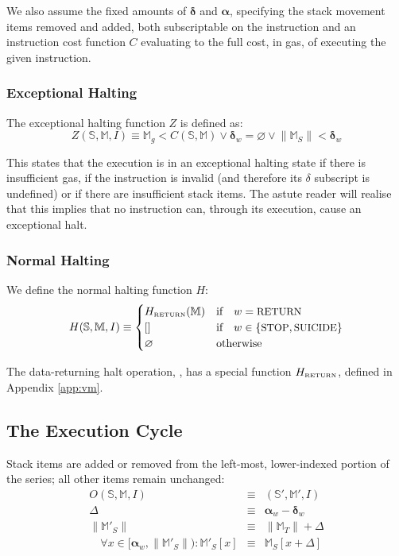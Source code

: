\documentclass[9pt,oneside]{amsart}
\begin{document}
\begin{multicols}{2}
We also assume the fixed amounts of $\mathbf{\delta}$ and $\mathbf{\alpha}$, specifying the stack movement items removed and added, both subscriptable on the instruction and an instruction cost function $C$ evaluating to the full cost, in gas, of executing the given instruction.

\subsubsection{Exceptional Halting}

The exceptional halting function $Z$ is defined as:
\begin{equation}
Z(\mathbb{S}, \mathbb{M}, I) \equiv \mathbb{M}_g < C(\mathbb{S}, \mathbb{M}) \vee \mathbf{\delta}_w = \varnothing \vee \lVert\mathbb{M}_S\rVert < \mathbf{\delta}_w
\end{equation}

This states that the execution is in an exceptional halting state if there is insufficient gas, if the instruction is invalid (and therefore its $\delta$ subscript is undefined) or if there are insufficient stack items. The astute reader will realise that this implies that no instruction can, through its execution, cause an exceptional halt.

\subsubsection{Normal Halting}

We define the normal halting function $H$:
\begin{equation}
H(\mathbb{S}, \mathbb{M}, I) \equiv \begin{cases}
H_{\text{\tiny RETURN}}(\mathbb{M}) & \text{if} \quad w = \text{\small RETURN} \\
[] & \text{if} \quad w \in \{ \text{\small STOP}, \text{\small SUICIDE} \} \\
\varnothing & \text{otherwise}
\end{cases}
\end{equation}

The data-returning halt operation, , has a special function $H_{\text{\tiny RETURN}}$, defined in Appendix \ref{app:vm}.

\subsection{The Execution Cycle}

Stack items are added or removed from the left-most, lower-indexed portion of the series; all other items remain unchanged:
\begin{eqnarray}
O(\mathbb{S}, \mathbb{M}, I) & \equiv & (\mathbb{S}', \mathbb{M}', I) \\
\Delta & \equiv & \mathbf{\alpha}_w - \mathbf{\delta}_w \\
\lVert\mathbb{M}'_{S}\rVert & \equiv & \lVert\mathbb{M}_T\rVert + \Delta \\
\quad \forall x \in [\mathbf{\alpha}_w, \lVert\mathbb{M}'_S\rVert): \mathbb{M}'_S[x] & \equiv & \mathbb{M}_S[x+\Delta]
\end{eqnarray}


\end{multicols}
\end{document}
